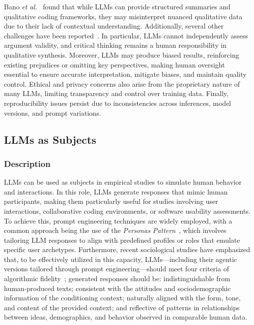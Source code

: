 \documentclass[11pt]{article}
\begin{document}
Bano \textit{et al.}~\cite{bano2023exploringqualitativeresearchusing} found that while LLMs can provide structured summaries and qualitative coding frameworks, they may misinterpret nuanced qualitative data due to their lack of contextual understanding. Additionally, several other challenges have been reported~\cite{DBLP:journals/ase/BanoHZT24, barros2024largelanguagemodelqualitative, leça2024applicationsimplicationslargelanguage}. In particular, LLMs cannot independently assess argument validity, and critical thinking remains a human responsibility in qualitative synthesis. Moreover, LLMs may produce biased results, reinforcing existing prejudices or omitting key perspectives, making human oversight essential to ensure accurate interpretation, mitigate biases, and maintain quality control. Ethical and privacy concerns also arise from the proprietary nature of many LLMs, limiting transparency and control over training data. Finally, reproducibility issues persist due to inconsistencies across inferences, model versions, and prompt variations.

\subsection{LLMs as Subjects}

\subsubsection{Description}

LLMs can be used as subjects in empirical studies to simulate human behavior and interactions. In this role, LLMs generate responses that mimic human participants, making them particularly useful for studies involving user interactions, collaborative coding environments, or software usability assessments. 
To achieve this, prompt engineering techniques are widely employed, with a common approach being the use of the \textit{Personas Pattern}~\cite{DBLP:journals/corr/abs-2308-07702}, which involves tailoring LLM responses to align with predefined profiles or roles that emulate specific user archetypes. 
Furthermore, recent sociological studies have emphasized that, to be effectively utilized in this capacity, LLMs—including their agentic versions tailored through prompt engineering—should meet four criteria of algorithmic fidelity~\cite{DBLP:journals/corr/abs-2209-06899}; generated responses should be: indistinguishable from human-produced texts; consistent with the attitudes and sociodemographic information of the conditioning context; naturally aligned with the form, tone, and content of the provided context; and reflective of patterns in relationships between ideas, demographics, and behavior observed in comparable human data.
\end{document}
